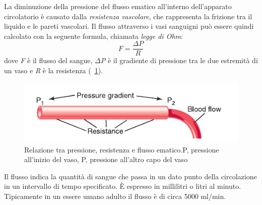 La diminuzione della pressione del flusso ematico all'interno dell'apparato circolatorio è causato dalla \textit{resistenza vascolare}, che rappresenta la frizione tra il liquido e le pareti vascolari. Il flusso attraverso i vasi sanguigni può essere quindi calcolato con la seguente formula, chiamata \textit{legge di Ohm}:
\begin{equation}
	F=\frac{\Delta P}{R}
	\label{eq:OhmsLaw}
\end{equation}
dove \textit{F} è il flusso del sangue, \textit{$\Delta$P} è il gradiente di pressione tra le due estremità di un vaso e \textit{R} è la resistenza  (\Fig~\ref{fig:FlussoSangue}).
\begin{figure}[h]
	\centering
	\includegraphics[width=0.7\linewidth]{ImageFiles/Fotopletismografia/FlussoSangue}
	\caption{Relazione tra pressione, resistenza e flusso ematico.P, pressione all'inizio del vaso, P, pressione all'altro capo del vaso}
	\label{fig:FlussoSangue}
\end{figure}
\par Il flusso indica la quantità di sangue che passa in un dato punto della circolazione in un intervallo di tempo specificato. \`E espresso in millilitri o litri al minuto. Tipicamente in un essere umano adulto il flusso è di circa 5000 ml/min.

